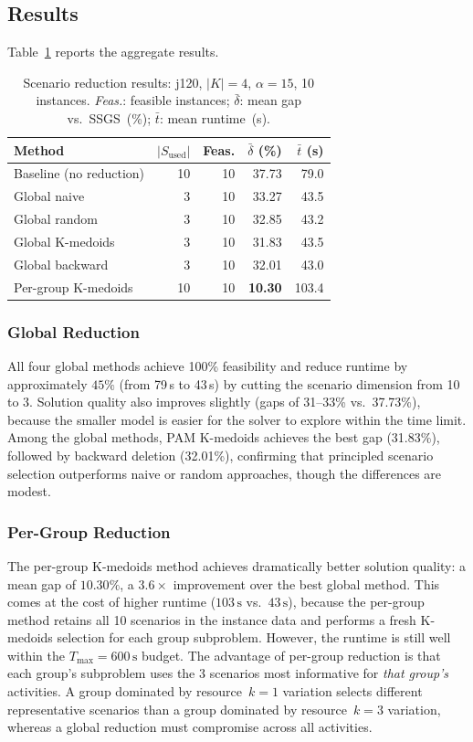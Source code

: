 \subsection{Results}
Table~\ref{tab:scen_red_j120} reports the aggregate results.
\begin{table}[htbp]
\centering
\renewcommand{\arraystretch}{1.35}
\caption{Scenario reduction results: j120, $|K|=4$,
         $\alpha=15$, 10 instances.
         \emph{Feas.}: feasible instances;
         $\bar{\delta}$: mean gap vs.\ SSGS~(\%);
         $\bar{t}$: mean runtime~(s).}
\label{tab:scen_red_j120}
\begin{tabular}{l r r r r}
\hline
\textbf{Method} & $|S_{\text{used}}|$ &
\textbf{Feas.} &
$\bar{\delta}$ (\%) &
$\bar{t}$ (s) \\
\hline
Baseline (no reduction)       & 10 & 10 & 37.73 &  79.0 \\
\hline
Global naive                  &  3 & 10 & 33.27 &  43.5 \\
Global random                 &  3 & 10 & 32.85 &  43.2 \\
Global K-medoids              &  3 & 10 & 31.83 &  43.5 \\
Global backward               &  3 & 10 & 32.01 &  43.0 \\
\hline
Per-group K-medoids           & 10 & 10 & \textbf{10.30} & 103.4 \\
\hline
\end{tabular}
\end{table}
\subsubsection*{Global Reduction}
All four global methods achieve 100\% feasibility and reduce
runtime by approximately $45\%$ (from 79\,s to 43\,s) by
cutting the scenario dimension from 10 to 3. Solution quality
also improves slightly (gaps of 31--33\% vs.\ 37.73\%), because
the smaller model is easier for the solver to explore within the
time limit. Among the global methods, PAM K-medoids achieves
the best gap (31.83\%), followed by backward deletion (32.01\%),
confirming that principled scenario selection outperforms naive
or random approaches, though the differences are modest.
\subsubsection*{Per-Group Reduction}
The per-group K-medoids method achieves dramatically better
solution quality: a mean gap of $10.30\%$, a $3.6\times$
improvement over the best global method. This comes at the cost
of higher runtime ($103\,\text{s}$ vs.\ $43\,\text{s}$), because
the per-group method retains all 10 scenarios in the instance
data and performs a fresh K-medoids selection for each group
subproblem. However, the runtime is still well within the
$T_{\max}=600\,\text{s}$ budget.
The advantage of per-group reduction is that each group's
subproblem uses the 3 scenarios most informative for \emph{that
group's} activities. A group dominated by resource~$k=1$
variation selects different representative scenarios than a
group dominated by resource~$k=3$ variation, whereas a global
reduction must compromise across all activities.
